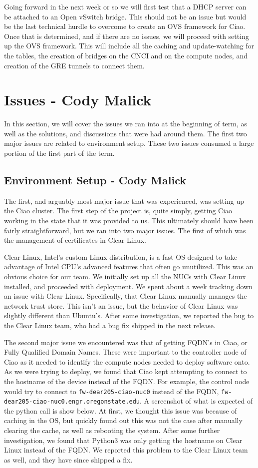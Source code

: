\documentclass[10pt,onecolumn,journal,draftclsnofoot]{IEEEtran}
\begin{document}
Going forward in the next week or so we will first test that a DHCP server can
be attached to an Open vSwitch bridge. This should not be an issue but would be
the last technical hurdle to overcome to create an OVS framework for Ciao. Once
that is determined, and if there are no issues, we will proceed with setting up
the OVS framework. This will include all the caching and update-watching for
the tables, the creation of bridges on the CNCI and on the compute nodes, and
creation of the GRE tunnels to connect them.

\section{Issues - Cody Malick}
In this section, we will cover the issues we ran into at the beginning of term,
as well as the solutions, and discussions that were had around them. The first
two major issues are related to environment setup. These two issues consumed a
large portion of the first part of the term.

\subsection{Environment Setup - Cody Malick}
The first, and arguably most major issue that was experienced, was setting up
the Ciao cluster. The first step of the project is, quite simply, getting Ciao
working in the state that it was provided to us. This ultimately should have
been fairly straightforward, but we ran into two major issues. The first of
which was the management of certificates in Clear Linux.

Clear Linux, Intel's custom Linux distribution, is a fast OS designed to take
advantage of Intel CPU's advanced features that often go unutilized. This was an
obvious choice for our team. We initially set up all the NUCs with Clear Linux
installed, and proceeded with deployment. We spent about a week tracking down an
issue with Clear Linux. Specifically, that Clear Linux manually manages the
network trust store. This isn't an issue, but the behavior of Clear Linux was
slightly different than Ubuntu's. After some investigation, we reported the bug
to the Clear Linux team, who had a bug fix shipped in the next release.

The second major issue we encountered was that of getting FQDN's in Ciao, or
Fully Qualified Domain Names. These were important to the controller node of
Ciao as it needed to identify the compute nodes needed to deploy software onto.
As we were trying to deploy, we found that Ciao kept attempting to connect to
the hostname of the device instead of the FQDN. For example, the control node
would try to connect to \texttt{fw-dear205-ciao-nuc0} instead of the FQDN,
\texttt{fw-dear205-ciao-nuc0.engr.oregonstate.edu}. A screenshot of what is
expected of the python call is show below. At first, we thought this issue was
because of caching in the OS, but quickly found out this was not the case after
manually clearing the cache, as well as rebooting the system.  After some
further investigation, we found that Python3 was only getting the hostname on
Clear Linux instead of the FQDN. We reported this problem to the Clear Linux
team as well, and they have since shipped a fix.
\end{document}
